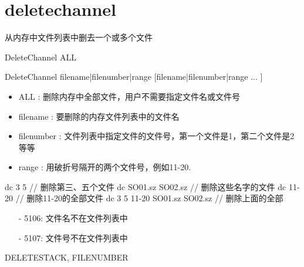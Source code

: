\section{deletechannel}
\label{cmd:deletechannel}

从内存中文件列表中删去一个或多个文件

DeleteChannel ALL

DeleteChannel filename|filenumber|range [filename|filenumber|range ... ]

\begin{itemize}
\item ALL : 删除内存中全部文件，用户不需要指定文件名或文件号
\item filename : 要删除的内存文件列表中的文件名
\item filenumber : 文件列表中指定文件的文件号，第一个文件是1，第二个文件是2等等
\item range : 用破折号隔开的两个文件号，例如11-20.
\end{itemize}

\begin{SACCode}
  dc 3 5                         // 删除第三、五个文件
  dc SO01.sz SO02.sz             // 删除这些名字的文件
  dc 11-20                       // 删除11-20的全部文件
  dc 3 5 11-20 SO01.sz SO02.sz   // 删除上面的全部
\end{SACCode}

\begin{itemize}
\item[-]5106: 文件名不在文件列表中
\item[-]5107: 文件号不在文件列表中
\end{itemize}

DELETESTACK, FILENUMBER

